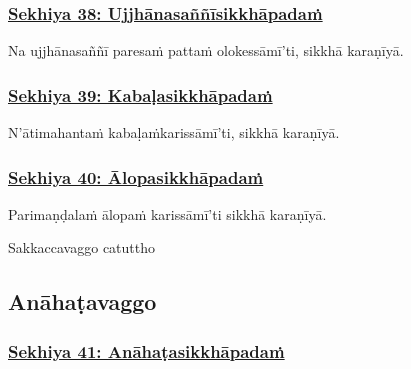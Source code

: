 \subsubsection*{\hyperref[training38]{Sekhiya 38: Ujjhānasaññīsikkhāpadaṁ}}
\label{sekh38}

Na ujjhānasaññī paresaṁ pattaṁ olokessāmī'ti, sikkhā karaṇīyā.



\subsubsection*{\hyperref[training39]{Sekhiya 39: Kabaḷasikkhāpadaṁ}}
\label{sekh39}

N'ātimahantaṁ kabaḷaṁ\makeatletter\hyperlink{endnote492-appendix}\makeatother \thinspace karissāmī'ti, sikkhā karaṇīyā.



\subsubsection*{\hyperref[training40]{Sekhiya 40: Ālopasikkhāpadaṁ}}
\label{sekh40}

Parimaṇḍalaṁ ālopaṁ karissāmī'ti sikkhā karaṇīyā.

\begin{center}
	Sakkaccavaggo catuttho\makeatletter\hyperlink{endnote493-appendix}\makeatother \thinspace
\end{center}



\subsection{Anāhaṭavaggo}

\subsubsection*{\hyperref[training41]{Sekhiya 41: Anāhaṭasikkhāpadaṁ}}
\label{sekh41}


